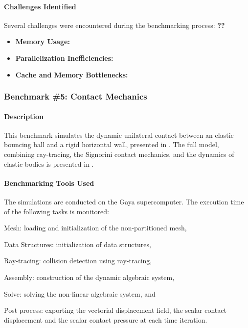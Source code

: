 \paragraph{Challenges Identified}
Several challenges were encountered during the benchmarking process: \textbf{??}
\begin{itemize}
    \item \textbf{Memory Usage:}
    \item \textbf{Parallelization Inefficiencies:}
    \item \textbf{Cache and Memory Bottlenecks:}
\end{itemize}



\subsubsection{Benchmark \#5: Contact Mechanics}

\paragraph{Description}
This benchmark simulates the dynamic unilateral contact between an elastic bouncing 
ball and a rigid horizontal wall, presented in \cite{chouly_explicit_2018}. The full model, 
combining ray-tracing, the Signorini contact mechanics, and the dynamics of elastic bodies 
is presented in \cite{van_landeghem_motion_nodate}. \\


\paragraph{Benchmarking Tools Used}

The simulations are conducted on the Gaya supercomputer. The execution time of the 
following tasks is monitored:

\begin{inparaenum}[\it (i)]
    \item Mesh: loading and initialization of the non-partitioned mesh,
    \item Data Structures: initialization of data structures,
    \item Ray-tracing: collision detection using ray-tracing,
    \item Assembly: construction of the dynamic algebraic system, 
    \item Solve: solving the non-linear algebraic system, and
    \item Post process: exporting the vectorial displacement field, the scalar contact displacement and the scalar contact pressure at each time iteration.
\end{inparaenum}

